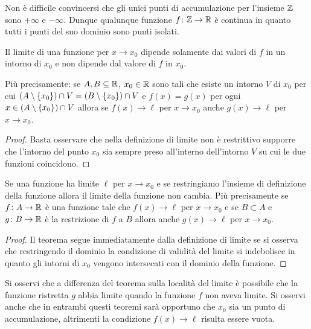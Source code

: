 \begin{example}
  Non è difficile convincersi che gli unici punti di accumulazione 
  per l'insieme ${\mathbb Z}$ sono $+\infty$ e $-\infty$.
  Dunque qualunque funzione $f\colon {\mathbb Z} \to {\mathbb R}$ è continua in quanto 
  tutti i punti del suo dominio sono punti isolati.
\end{example}
  
\begin{theorem}%
\label{th:localita_limite}%
Il limite di una funzione per $x\to x_0$ dipende solamente dai valori di $f$
in un intorno di $x_0$ e non dipende dal valore di $f$ in $x_0$.

Più precisamente: se $A,B\subseteq {\mathbb R}$, $x_0\in {\mathbb R}$ sono tali che 
esiste un intorno $V$ di $x_0$ per cui 
$(A\setminus{\left\{ x_0 \right\}}) \cap  V = (B\setminus {\left\{ x_0 \right\}}) \cap V$ 
e $f(x)=g(x)$ per ogni $x\in(A\setminus{\left\{ x_0 \right\}}) \cap  V$ 
allora se $f(x)\to \ell$ per $x\to x_0$ anche $g(x)\to \ell$ 
per $x\to x_0$.
\end{theorem}
%
\begin{proof}
  Basta osservare che nella definizione di limite 
  non è restrittivo supporre che l'intorno del punto $x_0$ 
  sia sempre preso all'interno dell'intorno $V$ su cui 
  le due funzioni coincidono.
\end{proof}

\begin{theorem}
Se una funzione ha limite $\ell$ per $x\to x_0$ 
e se restringiamo l'insieme di definizione della funzione 
allora il limite della funzione non cambia. 
Più precisamente
se $f\colon A \to {\mathbb R}$ è una funzione tale che $f(x)\to \ell$ per $x\to x_0$
e se $B \subset A$ e $g\colon B\to {\mathbb R}$ è la restrizione di $f$ 
a $B$ allora anche $g(x)\to \ell$ per $x\to x_0$. 
\end{theorem}
%
\begin{proof}
Il teorema segue immediatamente dalla definizione di limite se si osserva
che restringendo il dominio la condizione di validità del limite si indebolisce
in quanto gli intorni di $x_0$ vengono intersecati con il dominio della funzione.
\end{proof}

Si osservi che a differenza del teorema sulla località del limite è
possibile che la funzione ristretta $g$ abbia limite quando la funzione
$f$ non aveva limite.
Si osservi anche che in entrambi questi teoremi sarà opportuno 
che $x_0$ sia un punto di accumulazione, altrimenti la condizione $f(x)\to \ell$ 
risulta essere vuota.

